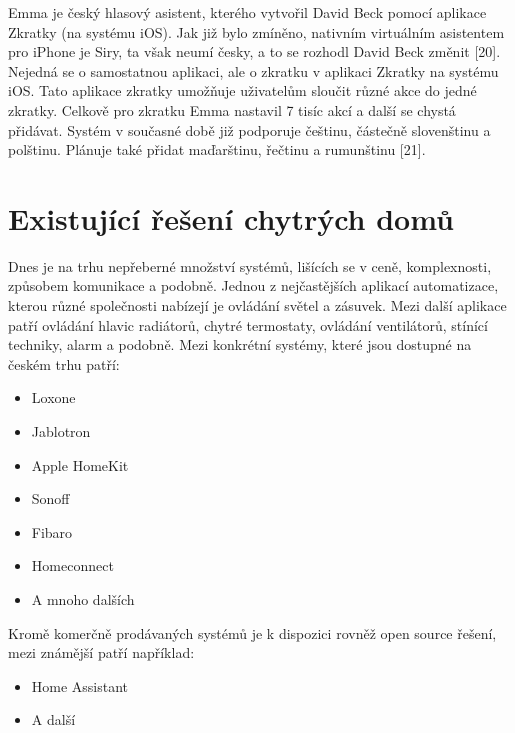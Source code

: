Emma je český hlasový asistent, kterého vytvořil David Beck pomocí aplikace Zkratky (na systému iOS). Jak již bylo zmíněno, nativním virtuálním asistentem pro iPhone je Siry, ta však neumí česky, a to se rozhodl David Beck změnit [20]. Nejedná se o samostatnou aplikaci, ale o zkratku v aplikaci Zkratky na systému iOS. Tato aplikace zkratky umožňuje uživatelům sloučit různé akce do jedné zkratky. Celkově pro zkratku Emma nastavil 7 tisíc akcí a další se chystá přidávat. Systém v současné době již podporuje češtinu, částečně slovenštinu a polštinu. Plánuje také přidat maďarštinu, řečtinu a rumunštinu [21]. 

\section{Existující řešení chytrých domů}
Dnes je na trhu nepřeberné množství systémů, lišících se v ceně, komplexnosti, způsobem komunikace a podobně. Jednou z nejčastějších aplikací automatizace, kterou různé společnosti nabízejí je ovládání světel a zásuvek. Mezi další aplikace patří ovládání hlavic radiátorů, chytré termostaty, ovládání ventilátorů, stínící techniky, alarm a podobně. Mezi konkrétní systémy, které jsou dostupné na českém trhu patří:
\begin{itemize}
\item Loxone
\item Jablotron
\item Apple HomeKit
\item Sonoff
\item Fibaro
\item Homeconnect
\item A mnoho dalších
\end{itemize}
Kromě komerčně prodávaných systémů je k dispozici rovněž open source řešení, mezi známější patří například:
\begin{itemize}
\item Home Assistant
\item A další
\end{itemize}

